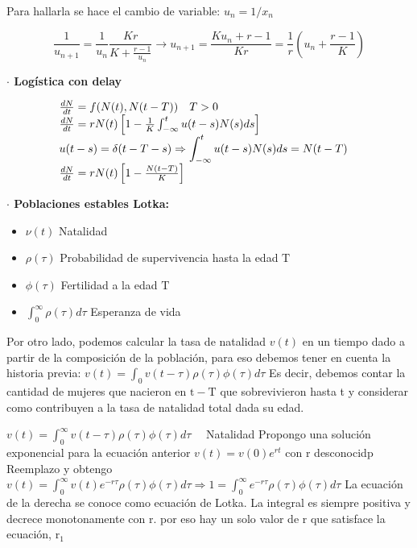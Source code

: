\documentclass[%
 reprint,
 amsmath,amssymb,
 aps,
]{revtex4-1}
\begin{document}
Para hallarla se hace el cambio de variable:
$
u_{n}=1 / x_{n}
$

$$
\frac{1}{u_{n+1}}=\frac{1}{u_{n}} \frac{K r}{K+\frac{r-1}{u_{n}}} \longrightarrow u_{n+1}=\frac{K u_{n}+r-1}{K r}=\frac{1}{r}\left(u_{n}+\frac{r-1}{K}\right)
$$

\textbf{$\cdot$ Logística con delay }

$$
\begin{aligned}\centering
&\begin{array}{l}
\frac{d N}{d t}=f(N(t), N(t-T)) \quad T>0 \\
\frac{d N}{d t}=r N(t)\left[1-\frac{1}{K} \int_{-\infty}^{t} u(t-s) N(s) d s\right] \\
\begin{aligned}
u(t-s)=\delta(t-T-s) \Rightarrow \int_{-\infty}^{t} u(t-s) N(s) d s=N(t-T)
\end{aligned} \\
\frac{d N}{d t}=r N(t)\left[1-\frac{N(t-T)}{K}\right]
\end{array}
\end{aligned}
$$

\textbf{$\cdot$ Poblaciones estables Lotka:}


\begin{itemize}
  \item[] $\nu(t)$ Natalidad
  \item[] $\rho(\tau)$ Probabilidad de supervivencia hasta la edad $\mathrm{T}$
  \item[] $\phi(\tau)$ Fertilidad a la edad $\mathrm{T}$
  \item[] $\int_{0}^{\infty} \rho(\tau) d \tau$ Esperanza de vida
\end{itemize}


Por otro lado, podemos calcular la tasa de natalidad $v(t)$ en un tiempo dado a partir de la composición de la población, para eso debemos tener en cuenta la historia previa:
$v(t)=\int_{0} v(t-\tau) \rho(\tau) \phi(\tau) d \tau$
Es decir, debemos contar la cantidad de mujeres que nacieron en $\mathrm{t}-\mathrm{T}$ que sobrevivieron hasta t y considerar como contribuyen a la tasa de natalidad total dada su edad.


$v(t)=\int_{0}^{\infty} v(t-\tau) \rho(\tau) \phi(\tau) d \tau \quad$ Natalidad
Propongo una solución exponencial para la ecuación anterior $v(t)=v(0) e^{r t}$
con $\mathrm{r}$ desconocidp
Reemplazo y obtengo
$v(t)=\int_{0}^{\infty} v(t) e^{-r \tau} \rho(\tau) \phi(\tau) d \tau \Rightarrow 1=\int_{0}^{\infty} e^{-r \tau} \rho(\tau) \phi(\tau) d \tau$
La ecuación de la derecha se conoce como ecuación de Lotka. La integral es siempre positiva y decrece monotonamente con $\mathrm{r}$. por eso hay un solo valor de $\mathrm{r}$ que satisface la ecuación, $\mathrm{r}_{1}$
\end{document}
